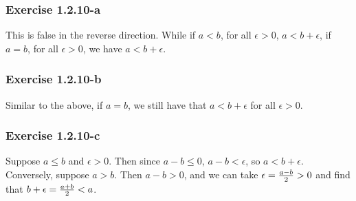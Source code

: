 \documentclass{article}
\newcommand{\e}{\epsilon}
\begin{document}
\subsubsection*{Exercise 1.2.10-a}

This is false in the reverse direction. While if $a < b$, for all $\e > 0$, $a < b + \e$, if $a = b$, for all $\e > 0$, we have $a < b + \e$.

\subsubsection*{Exercise 1.2.10-b}

Similar to the above, if $a = b$, we still have that $a < b + \e$ for all $\e > 0$.

\subsubsection*{Exercise 1.2.10-c}

Suppose $a \leq b$ and $\e > 0$. Then since $a - b \leq 0$, $a - b < \e$, so $a < b + \e$.
Conversely, suppose $a > b$. Then $a - b > 0$, and we can take $\e = {a - b \over 2} > 0$ and find that $b + \e = {a + b \over 2} < a$.
\end{document}
